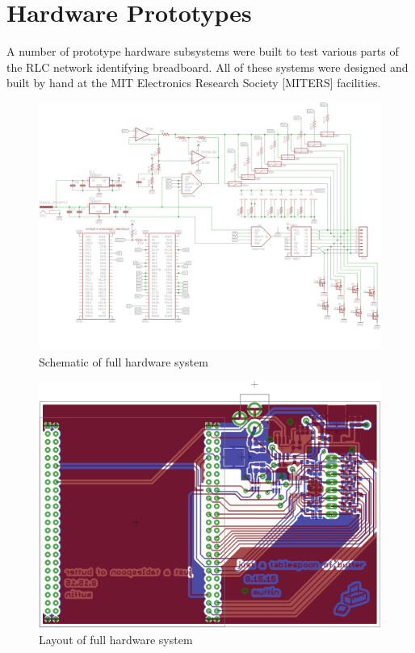 \documentclass[11pt,twoside]{mitthesis}
\begin{document}
\section{Hardware Prototypes}

A number of prototype hardware subsystems were built to test various parts of the RLC network identifying breadboard.
All of these systems were designed and built by hand at the MIT Electronics Research Society [MITERS] facilities.

\begin{figure}[h]
  \begin{center}
      \includegraphics[width=1.08\textwidth, angle =90]{../schem1.png}
      \caption{Schematic of full hardware system}
  \end{center}
\end{figure}

\begin{figure}[h]
  \begin{center}
      \includegraphics[width=.9\textwidth]{../layout-tb.png}
      \caption{Layout of full hardware system}
  \end{center}
\end{figure}
\end{document}
